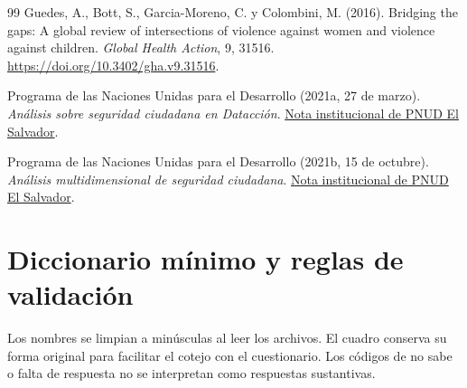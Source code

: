 \documentclass[11pt,a4paper]{article}
\begin{document}
\begin{thebibliography}{99}
Guedes, A., Bott, S., Garcia-Moreno, C. y Colombini, M. (2016).
Bridging the gaps: A global review of intersections of violence against women
and violence against children. \emph{Global Health Action}, 9, 31516.
\url{https://doi.org/10.3402/gha.v9.31516}.

Programa de las Naciones Unidas para el Desarrollo (2021a, 27 de marzo).
\emph{Análisis sobre seguridad ciudadana en Datacción}.
\href{https://www.undp.org/es/el-salvador/noticias/analisis-sobre-seguridad-ciudadana-en-dataccion}{Nota institucional de PNUD El Salvador}.

Programa de las Naciones Unidas para el Desarrollo (2021b, 15 de octubre).
\emph{Análisis multidimensional de seguridad ciudadana}.
\href{https://www.undp.org/es/el-salvador/noticias/analisis-multidimensional-de-seguridad-ciudadana}{Nota institucional de PNUD El Salvador}.
\end{thebibliography}

\clearpage
\appendix
\section{Diccionario mínimo y reglas de validación}\label{anexo:diccionario}
Los nombres se limpian a minúsculas al leer los archivos. El cuadro conserva
su forma original para facilitar el cotejo con el cuestionario. Los códigos
de no sabe o falta de respuesta no se interpretan como respuestas sustantivas.
\end{document}
